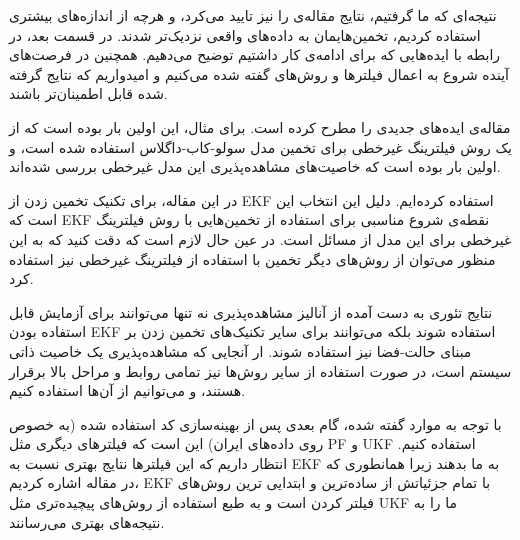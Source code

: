 \documentclass[11pt, fleqn]{article}
\begin{document}
\begin{multicols}{2}
نتیجه‌ای که ما گرفتیم، نتایج مقاله‌ی 
\cite{main}
را نیز تایید می‌کرد، و هرچه از اندازه‌های بیشتری استفاده کردیم، تخمین‌هایمان به داده‌های واقعی نزدیک‌تر شدند. در قسمت بعد، در رابطه با ایده‌هایی که برای ادامه‌ی کار داشتیم توضیح می‌دهیم. همچنین در فرصت‌های آینده شروع به اعمال فیلترها و روش‌های گفته شده می‌کنیم و امیدواریم که نتایج گرفته شده قابل اطمینان‌تر باشند.































مقاله‌ی
\cite{main}
 ایده‌های جدیدی را مطرح کرده است. برای مثال، این اولین بار بوده است که از یک روش فیلترینگ غیرخطی برای تخمین مدل سولو-کاب-داگلاس استفاده شده است، و اولین بار بوده است که خاصیت‌های مشاهده‌پذیری این مدل غیرخطی بررسی شده‌اند. 

در این مقاله، برای تکنیک تخمین زدن از EKF استفاده کرده‌ایم. دلیل این انتخاب این است که EKF نقطه‌ی شروع مناسبی برای استفاده از تخمین‌هایی با روش فیلترینگ غیرخطی برای این مدل از مسائل است. در عین حال لازم است که دقت کنید که به این منظور می‌توان از روش‌های دیگر تخمین‌ با استفاده از فیلترینگ غیرخطی نیز استفاده کرد.

نتایج تئوری به دست آمده از آنالیز مشاهده‌پذیری نه تنها می‌توانند برای آزمایش قابل استفاده بودن EKF استفاده شوند بلکه می‌توانند برای سایر تکنیک‌های تخمین زدن بر مبنای حالت-فضا
نیز استفاده شوند. ار آنجایی که مشاهده‌پذیری یک خاصیت ذاتی سیستم است، در صورت استفاده از سایر روش‌ها نیز تمامی روابط و مراحل بالا برقرار هستند، و می‌توانیم از آن‌ها استفاده کنیم.

با توجه به موارد گفته شده، گام بعدی پس از بهینه‌سازی کد استفاده شده (به خصوص روی داده‌های ایران) این است که فیلتر‌های دیگری مثل
PF
و
UKF
استفاده کنیم. انتظار داریم که این فیلترها نتایج بهتری نسبت به
EKF
به ما بدهند زیرا همانطوری که در مقاله اشاره کردیم، 
EKF
با تمام جزئیاتش از ساده‌ترین و ابتدایی ترین روش‌های فیلتر کردن است و به طبع استفاده از روش‌های پیچیده‌تری مثل UKF ما را به نتیجه‌های بهتری می‌رسانند.

\end{multicols}
\end{document}
